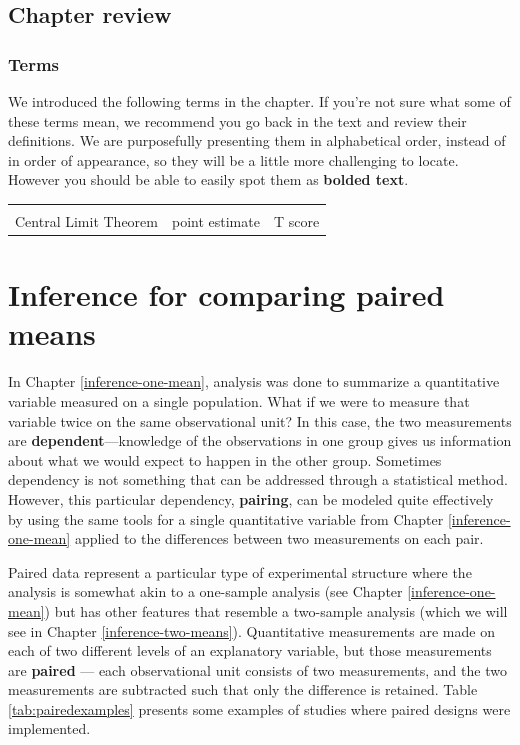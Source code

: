 \documentclass[
  10pt,
  openany]{book}
\theoremstyle{definition}
\theoremstyle{definition}
\theoremstyle{definition}
\theoremstyle{definition}
\theoremstyle{remark}
\begin{document}
\section{Chapter review}\label{chp17-review}

\subsection*{Terms}\label{terms-13}

We introduced the following terms in the chapter. If you're not sure what some of these terms mean, we recommend you go back in the text and review their definitions. We are purposefully presenting them in alphabetical order, instead of in order of appearance, so they will be a little more challenging to locate. However you should be able to easily spot them as \textbf{bolded text}.

\begin{tabu} to 
\toprule
{} &  & \\
Central Limit Theorem & point estimate & T score\\
\bottomrule
\end{tabu}

\chapter{Inference for comparing paired means}\label{inference-paired-means}

In Chapter \ref{inference-one-mean}, analysis was done to summarize a quantitative variable measured on a single population.
What if we were to measure that variable twice on the same observational unit?
In this case, the two measurements are \textbf{dependent}---knowledge of the observations in one group gives us information about what we would expect to happen in the other group.
Sometimes dependency is not something that can be addressed through a statistical method.
However, this particular dependency, \textbf{pairing}, can be modeled quite effectively by using the same tools for a single quantitative variable from Chapter \ref{inference-one-mean} applied to the differences between two measurements on each pair.

Paired data represent a particular type of experimental structure where the analysis is somewhat akin to a one-sample analysis (see Chapter \ref{inference-one-mean}) but has other features that resemble a two-sample analysis (which we will see in Chapter \ref{inference-two-means}). Quantitative measurements are made on each of two different levels of an explanatory variable, but those measurements are \textbf{paired} --- each observational unit consists of two measurements, and the two measurements are subtracted such that only the difference is retained. Table \ref{tab:pairedexamples} presents some examples of studies where paired designs were implemented.
\end{document}
